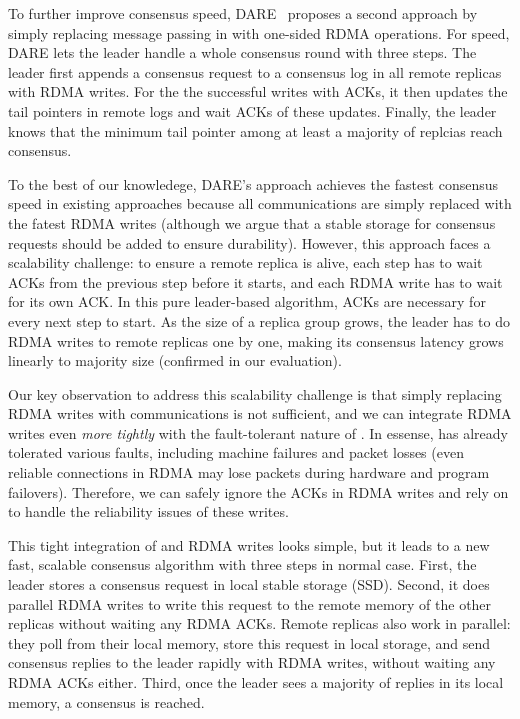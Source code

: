 To further improve consensus speed, DARE~\cite{dare:hpdc15} proposes a second 
approach by simply replacing message passing in \paxos with one-sided RDMA 
operations. For speed, DARE lets the leader handle a whole consensus round
with three steps. The leader first appends a consensus request to a consensus 
log in all remote replicas with RDMA writes. For the the successful writes with 
ACKs, it then updates the tail pointers in remote logs and wait ACKs of these 
updates. Finally, the leader knows that the minimum tail pointer among at 
least a majority of replcias reach consensus.

To the best of our knowledege, DARE's approach achieves the fastest consensus 
speed in existing approaches because all communications are simply replaced 
with the fatest RDMA writes (although we argue that a stable storage for 
consensus requests should be added to ensure \paxos durability). However, this 
approach faces a scalability challenge: to ensure a remote replica is alive, 
each step has to wait ACKs from the previous step before it starts, and each 
RDMA write has to wait for its own ACK. In this pure leader-based algorithm, 
ACKs are necessary for every next step to start. As the size of a replica 
group grows, the leader has to do RDMA writes to remote replicas one by one, 
making its consensus latency grows linearly to majority size (confirmed 
in our evaluation).

Our key observation to address this scalability challenge is that simply 
replacing RDMA writes with \paxos communications is not sufficient, and we can 
integrate RDMA writes even \emph{more tightly} with the fault-tolerant nature 
of \paxos. In essense, \paxos has already tolerated various faults, including 
machine failures and packet losses (even reliable connections in RDMA may lose 
packets during hardware and program failovers). Therefore, we can safely ignore 
the ACKs in RDMA writes and rely on \paxos to handle the reliability issues of 
these writes.

This tight integration of \paxos and RDMA writes looks simple, but it leads to 
a new fast, scalable \paxos consensus algorithm with three steps in normal 
case. First, the leader stores a consensus request in local stable storage 
(SSD). Second, it does parallel RDMA writes to write this request to the remote 
memory of the other replicas without waiting any RDMA ACKs. Remote replicas 
also work in parallel: they poll from their local memory, store this request in 
local storage, and send consensus replies to the leader rapidly with RDMA 
writes, without waiting any RDMA ACKs either. Third, once the leader sees a 
majority of replies in its local memory, a consensus is reached.

